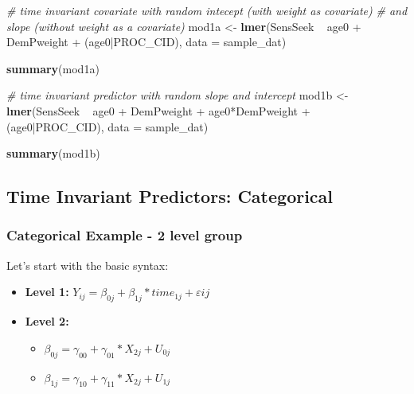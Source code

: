 \documentclass[]{article}
\newenvironment{Shaded}{\begin{snugshade}}{\end{snugshade}}
\newcommand{\KeywordTok}[1]{\textcolor[rgb]{0.13,0.29,0.53}{\textbf{{#1}}}}
\newcommand{\DataTypeTok}[1]{\textcolor[rgb]{0.13,0.29,0.53}{{#1}}}
\newcommand{\StringTok}[1]{\textcolor[rgb]{0.31,0.60,0.02}{{#1}}}
\newcommand{\CommentTok}[1]{\textcolor[rgb]{0.56,0.35,0.01}{\textit{{#1}}}}
\newcommand{\NormalTok}[1]{{#1}}
\begin{document}
\begin{Shaded}
\begin{Highlighting}[]
\CommentTok{# time invariant covariate with random intecept (with weight as covariate) }
\CommentTok{# and slope (without weight as a covariate)}
\NormalTok{mod1a <-}\StringTok{ }\KeywordTok{lmer}\NormalTok{(SensSeek ~}\StringTok{ }\NormalTok{age0 +}\StringTok{ }\NormalTok{DemPweight +}\StringTok{ }\NormalTok{(age0|PROC_CID), }
              \DataTypeTok{data =} \NormalTok{sample_dat)}

\KeywordTok{summary}\NormalTok{(mod1a)}

\CommentTok{# time invariant predictor with random slope and intercept}
\NormalTok{mod1b <-}\StringTok{ }\KeywordTok{lmer}\NormalTok{(SensSeek ~}\StringTok{ }\NormalTok{age0 +}\StringTok{ }\NormalTok{DemPweight +}\StringTok{ }\NormalTok{age0*DemPweight +}\StringTok{ }
\StringTok{                }\NormalTok{(age0|PROC_CID), }\DataTypeTok{data =} \NormalTok{sample_dat)}

\KeywordTok{summary}\NormalTok{(mod1b)}
\end{Highlighting}
\end{Shaded}

\normalsize

\subsection{Time Invariant Predictors:
Categorical}\label{time-invariant-predictors-categorical}

\subsubsection{Categorical Example - 2 level
group}\label{categorical-example---2-level-group}

Let's start with the basic syntax:

\begin{itemize}
  \item \textbf{Level 1:} $Y_{ij} = \beta_{0j} + \beta_{1j}*time_{1j} + \varepsilon{ij}$
  \item \textbf{Level 2:} 
    \begin{itemize} 
      \item $\beta_{0j} = \gamma_{00} + \gamma_{01}*X_{2j} + U_{0j}$
      \item $\beta_{1j} = \gamma_{10} + \gamma_{11}*X_{2j} + U_{1j}$
    \end{itemize}
\end{itemize}
\end{document}

